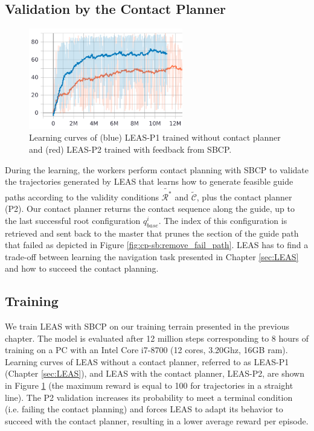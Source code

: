 \subsection{Validation by the Contact Planner}
\begin{figure}[t]
    \centering
    \includegraphics[width=0.6\textwidth]{Figures/Chapter_CPSB/learning_curve_p1_p2.png}
    \caption{Learning curves of (blue) LEAS-P1 trained without contact planner and (red) LEAS-P2 trained with feedback from SBCP.}
    \label{fig:cp-sb:learning_curves_p1_p2}
\end{figure}
During the learning, the workers perform contact planning with SBCP to validate the trajectories generated by LEAS that learns how to generate feasible guide paths according to the validity conditions $\tilde{\mathcal{R}^*}$ and $\tilde{\mathcal{C}}$, plus the contact planner (P2).
Our contact planner returns the contact sequence along the guide, up to the last successful root configuration $q_{base}^i$.
The index of this configuration is retrieved and sent back to the master that prunes the section of the guide path that failed as depicted in Figure \ref{fig:cp-sb:remove_fail_path}.
LEAS has to find a trade-off between learning the navigation task presented in Chapter \ref{sec:LEAS} and how to succeed the contact planning.

\subsection{Training}
We train LEAS with SBCP on our training terrain presented in the previous chapter.
The model is evaluated after 12 million steps corresponding to 8 hours of training on a PC with an Intel Core i7-8700 (12 cores, 3.20Ghz, 16GB ram). 
Learning curves of LEAS without a contact planner, referred to as LEAS-P1 (Chapter \ref{sec:LEAS}), and LEAS with the contact planner, LEAS-P2, are shown in Figure \ref{fig:cp-sb:learning_curves_p1_p2} (the maximum reward is equal to 100 for trajectories in a straight line). 
The P2 validation increases its probability to meet a terminal condition (i.e. failing the contact planning) and forces LEAS to adapt its behavior to succeed with the contact planner, resulting in a lower average reward per episode.

